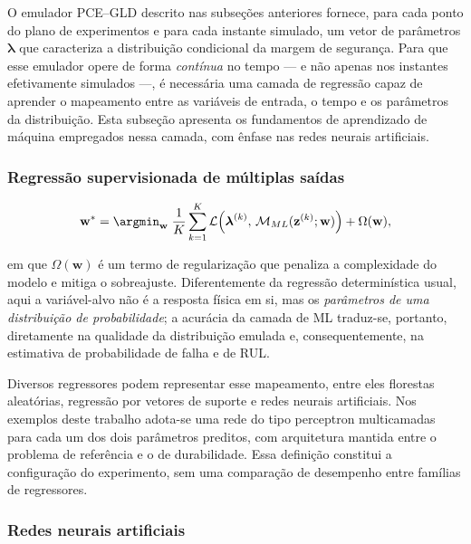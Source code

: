O emulador PCE--GLD descrito nas subseções anteriores fornece, para cada ponto do plano de experimentos e para cada instante simulado, um vetor de parâmetros $\boldsymbol{\lambda}$ que caracteriza a distribuição condicional da margem de segurança. Para que esse emulador opere de forma \textit{contínua} no tempo --- e não apenas nos instantes efetivamente simulados ---, é necessária uma camada de regressão capaz de aprender o mapeamento entre as variáveis de entrada, o tempo e os parâmetros da distribuição. Esta subseção apresenta os fundamentos de aprendizado de máquina empregados nessa camada, com ênfase nas redes neurais artificiais.

\subsubsection{Regress\~ao supervisionada de m\'ultiplas sa\'idas}
\label{subsec:ml_fundamentos}


\begin{equation}
\mathbf{w}^{*} = \argmin_{\mathbf{w}} \; \frac{1}{K}\sum_{k=1}^{K} \mathcal{L}\!\left(\boldsymbol{\lambda}^{(k)},\, \mathcal{M}_{ML}(\mathbf{z}^{(k)};\mathbf{w})\right) + \Omega(\mathbf{w}),
\label{eq:ml_treinamento}
\end{equation}

\noindent em que $\Omega(\mathbf{w})$ é um termo de regularização que penaliza a complexidade do modelo e mitiga o sobreajuste. Diferentemente da regressão determinística usual, aqui a variável-alvo não é a resposta física em si, mas os \textit{parâmetros de uma distribuição de probabilidade}; a acurácia da camada de ML traduz-se, portanto, diretamente na qualidade da distribuição emulada e, consequentemente, na estimativa de probabilidade de falha e de RUL.

Diversos regressores podem representar esse mapeamento, entre eles florestas aleatórias, regressão por vetores de suporte e redes neurais artificiais. Nos exemplos deste trabalho adota-se uma rede do tipo perceptron multicamadas para cada um dos dois parâmetros preditos, com arquitetura mantida entre o problema de referência e o de durabilidade. Essa definição constitui a configuração do experimento, sem uma comparação de desempenho entre famílias de regressores.

\subsubsection{Redes neurais artificiais}
\label{subsec:redes_neurais}


